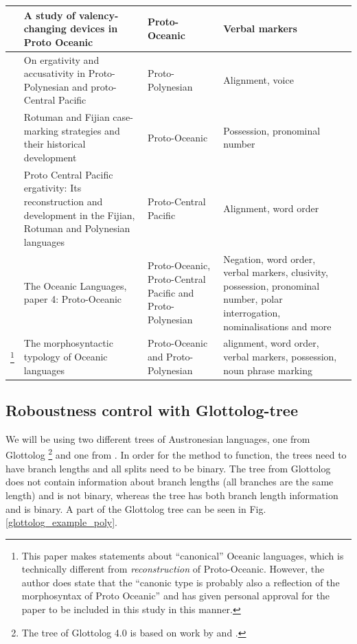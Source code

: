 \documentclass[a4paper,10pt]{article} %
\begin{document}
\begin{longtable}{|p{3cm}|  p{5cm}| p{4cm} | p{3cm}  | p{3cm} |}
\citet{evans2003study} & A study of valency-changing devices in Proto Oceanic & Proto-Oceanic & Verbal markers \\ \hline

\citet{ball2007ergativity} & On ergativity and accusativity in Proto-Polynesian and proto-Central Pacific&Proto-Polynesian & Alignment, voice \\ \hline

\citet{kikusawa2001rotuman} & Rotuman and Fijian case-marking strategies and their historical development  & Proto-Oceanic & Possession, pronominal number \\ \hline

\citet{kikusawa2002proto}  & Proto Central Pacific ergativity: Its reconstruction and development in the Fijian, Rotuman and Polynesian languages & Proto-Central Pacific   & Alignment, word order \\ \hline

\citet{lynchrosscrowley_proto_grammar_oceanic} & The Oceanic Languages, paper 4: Proto-Oceanic & Proto-Oceanic, Proto-Central Pacific and Proto-Polynesian & Negation, word order, verbal markers, clusivity, possession, pronominal number, polar interrogation, nominalisations and more \\ \hline

\citet{ross2004morphosyntactic}\footnote{This paper makes statements about ``canonical'' Oceanic languages, which is technically different from \emph{reconstruction} of Proto-Oceanic. However, the author does state that the ``canonic type is probably also a reflection of the morphosyntax of Proto Oceanic'' \citep[492]{ross2004morphosyntactic} and has given personal approval for the paper to be included in this study in this manner.}  & The morphosyntactic typology of Oceanic languages &  Proto-Oceanic and Proto-Polynesian  & alignment, word order, verbal markers, possession, noun phrase marking \\ \hline
\end{longtable}



\subsection{Roboustness control with Glottolog-tree}


We will be using two different trees of Austronesian languages, one from Glottolog \citep{glottolog40}\footnote{The tree of Glottolog 4.0 is based on work by \citet{blust_2009, blust_2014} and \citet{blust_chen_2017}.} and one from \citet{grayetal_2009}. In order for the method to function, the trees need to have branch lengths and all splits need to be binary. The tree from Glottolog does not contain information about branch lengths (all branches are the same length) and is not binary, whereas the \citet{grayetal_2009} tree has both branch length information and is binary. A part of the Glottolog tree can be seen in Fig. \ref{glottolog_example_poly}.
\end{document}
